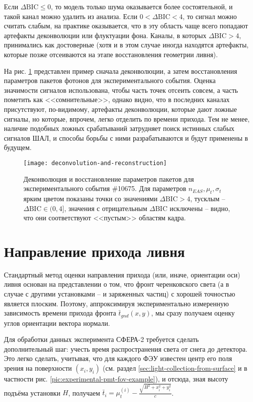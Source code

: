 Если $\Delta \mathrm{BIC} \leq 0$, то модель только шума оказывается более состоятельной, и такой канал можно удалить из анализа. Если $0 < \Delta \mathrm{BIC} < 4$, то сигнал можно считать слабым, на практике оказывается, что в эту область чаще всего попадают артефакты деконволюции или флуктуации фона. Каналы, в которых $\Delta \mathrm{BIC} > 4$, принимались как достоверные (хотя и в этом случае иногда находятся артефакты, которые позже отсеиваются на этапе восстановления геометрии ливня).

На рис. \ref{pic:deconvolution-and-reconstruction} представлен пример сначала деконволюции, а затем восстановления параметров пакетов фотонов для экспериментального события. Оценка значимости сигналов использована, чтобы часть точек отсеить совсем, а часть пометить как <<сомнительные>>, однако видно, что в последних каналах присутствуют, по-видимому, артефакты деконволюции, которые дают ложные сигналы, но которые, впрочем, легко отделить по времени прихода. Тем не менее, наличие подобных ложных срабатываний затрудняет поиск истинных слабых сигналов ШАЛ, и способы борьбы с ними разрабатываются и будут применены в будущем.

\begin{figure}
	\centering
	\texttt{[image: deconvolution-and-reconstruction]}
	\caption{Деконволюция и восстановление параметров пакетов для экспериментального события \#10675. Для параметров $n_{EAS}, \mu_t, \sigma_t$ ярким цветом показаны точки со значениями $\Delta \mathrm{BIC} > 4$, тусклым -- $\Delta \mathrm{BIC} \in (0, 4]$, значения с отрицательным $\Delta \mathrm{BIC}$ исключены -- видно, что они соответствуют <<пустым>> областям кадра.}
	\label{pic:deconvolution-and-reconstruction}
\end{figure}


\section{Направление прихода ливня}

Стандартный метод оценки направления прихода (или, иначе, ориентации оси) ливня основан на представлении о том, что фронт черенковского света (а в случае с другими установками -- и заряженных частиц) с хорошей точностью является плоским. Поэтому, аппроксимируя экспериментально измеренную зависимость времени прихода фронта $\bar{t}_{gnd}(x, y)$, мы сразу получаем оценку углов ориентации вектора нормали.

Для обработки данных эксперимента СФЕРА-2 требуется сделать дополнительный шаг: учесть время распространения света от снега до детектора. Это легко сделать, учитывая, что для каждого ФЭУ известен центр его поля зрения на поверхности $(x_i, y_i)$ (см. раздел \ref{sec:light-collection-from-surface} и в частности рис. \ref{pic:experimental-pmt-fov-example}), и отсюда, зная высоту подъёма установки $H$, получаем $\bar{t}_{i} = \mu_t^{(i)} - \frac{\sqrt{H^2 + x_i^2 + y_i^2}}{c}$.

